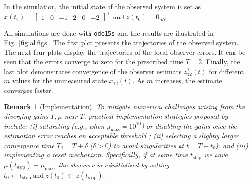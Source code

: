 \documentclass[journal]{IEEEtran}
\newtheorem{remark}{Remark}
\def\T{\top}
\begin{document}
In the simulation, the initial state of the observed system is set as $x(t_0) = \begin{bmatrix}
        1 & 0 & -1 & 2 & 0 & -2
    \end{bmatrix}^\T$
and $z(t_0)=0_{nN}$.



All simulations are done with \texttt{ode15s} and the results are illustrated in Fig.~\ref{fig:allfigs}. The first plot presents the trajectories of the observed system. The next four plots display the trajectories of the local observer errors. It can be seen that the errors converge to zero for the prescribed time $T=2$. Finally, the last plot demonstrates convergence of the observer estimate $z^1_{12}(t)$ for different $m$ values for the unmeasured state $x_{12}(t)$. As $m$ increases, the estimate converges faster.

\begin{remark}[Implementation]
To mitigate numerical challenges arising from the diverging gains \(\Gamma,\mu\) near \(T\), practical implementation strategies proposed by \cite{Holloway19} include: (i) saturating (e.g., when \(\mu_{\max}=10^{10}\)) or disabling the gains once the estimation error reaches an acceptable threshold ; (ii) selecting a slightly larger convergence time \(T_{\delta}=T+\delta\) (\(\delta>0\)) to avoid singularities at \(t=T+t_0\)); and (iii) implementing a reset mechanism. Specifically, if at some time \(t_\text{stop}\) we have \(\mu(t_\text{stop})=\mu_{\max}\), the observer is reinitialized by setting \( t_0\leftarrow t_\text{stop} ~\text{and}~ z(t_0)\leftarrow z(t_\text{stop}).\)
\end{remark}
\end{document}
